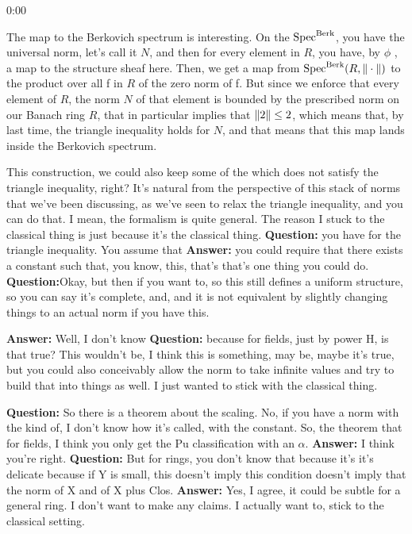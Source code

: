 \begin{unfinished}{0:00}

The map to the Berkovich spectrum is interesting. On the $\operatorname{Spec}^{\mathrm{Berk}}$, you have the universal norm, let's call it $N$, and then for every element in $R$, you have, by $\phi$ , a map to the structure sheaf here. Then, we get a map from $\operatorname{Spec}^{\mathrm{Berk}} (R, \| \cdot \| )$ to the product over all f in $R$ of the zero norm of f.
But since we enforce that every element of $R$, the norm $N$ of that element is bounded by the prescribed norm on our Banach ring $R$, that in particular implies that $\| 2 \| \leq 2$, which means that, by last time, the triangle inequality holds for $N$, and that means that this map lands inside the Berkovich spectrum.


This construction, we could also keep some of the which does not satisfy the triangle inequality, right? 
It's natural from the perspective of this stack of norms that we've been discussing, as we've seen to relax the triangle inequality, and you can do that. I mean, the formalism is quite general.
The reason I stuck to the classical thing is just because it's the classical thing.
\textbf{Question:} you have for the triangle inequality. You assume that 
\textbf{Answer:}  you could require that there exists a constant such that, you know, this, that's that's one thing you could do. 
\textbf{Question:}Okay, but then if you want to, so this still defines a uniform structure, so you can say it's complete, and, and it is not equivalent by slightly changing things to an actual norm if you have this. 

\textbf{Answer:} Well, I don't know 
\textbf{Question:} because for fields, just by power H, is that true? This wouldn't be, I think this is something, may be, maybe it's true, but you could also conceivably allow the norm to take infinite values and try to build that into things as well. I just wanted to stick with the classical thing.

\textbf{Question:} So there is a theorem about the scaling. No, if you have a norm with the kind of, I don't know how it's called, with the constant. So, the theorem that for fields, I think you only get the Pu classification with an $\alpha$. 
\textbf{Answer:} I think you're right. 
\textbf{Question:} But for rings, you don't know that because it's it's delicate because if Y is small, this doesn't imply this condition doesn't imply that the norm of X and of X plus Clos.
\textbf{Answer:} Yes, I agree, it could be subtle for a general ring. I don't want to make any claims. I actually want to, stick to the classical setting.


\end{unfinished}
